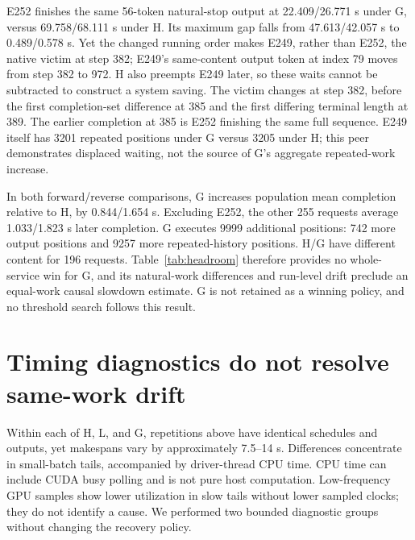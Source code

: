\documentclass[10pt,a4paper]{article}
\begin{document}
E252 finishes the same 56-token natural-stop output at 22.409/26.771 s under G,
versus 69.758/68.111 s under H. Its maximum gap falls from 47.613/42.057 s to
0.489/0.578 s. Yet the changed running order makes E249, rather than E252, the
native victim at step 382; E249's same-content output token at index 79 moves
from step 382 to 972. H also preempts E249 later, so these waits cannot be
subtracted to construct a system saving.
The victim changes at step 382, before the first completion-set difference
at 385 and the first differing terminal length at 389. The earlier completion
at 385 is E252 finishing the same full sequence. E249 itself has 3201 repeated
positions under G versus 3205 under H; this peer demonstrates displaced waiting,
not the source of G's aggregate repeated-work increase.

In both forward/reverse comparisons, G increases population mean completion
relative to H, by 0.844/1.654 s. Excluding E252, the other 255 requests average
1.033/1.823 s later completion. G executes 9999 additional positions: 742 more
output positions and 9257 more repeated-history positions. H/G have different
content for 196 requests. Table~\ref{tab:headroom} therefore provides no
whole-service win for G, and its natural-work differences and run-level drift
preclude an equal-work causal slowdown estimate. G is not retained as a winning
policy, and no threshold search follows this result.

\section{Timing diagnostics do not resolve same-work drift}
Within each of H, L, and G, repetitions above have identical schedules and
outputs, yet makespans vary by approximately 7.5--14 s. Differences concentrate
in small-batch tails, accompanied by driver-thread CPU time. CPU time can
include CUDA busy polling and is not pure host computation. Low-frequency GPU
samples show lower utilization in slow tails without lower sampled clocks;
they do not identify a cause. We performed two bounded diagnostic groups
without changing the recovery policy.
\end{document}
